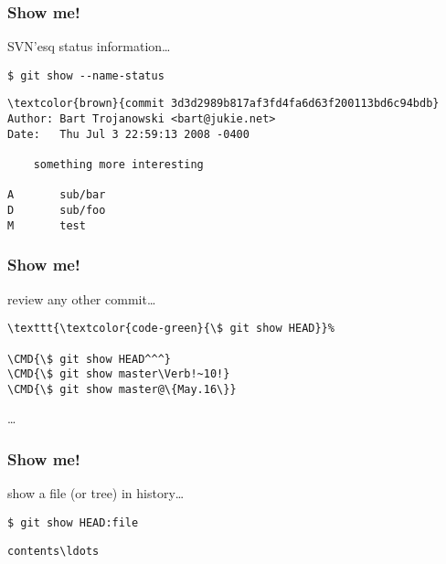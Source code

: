 \documentclass[english]{beamer}
\newcommand{\CMD}[1]{%
\texttt{\textcolor{code-green}{#1}}%
}
\begin{document}
\begin{frame}[fragile]
\frametitle{Show me!}

SVN'esq status information\ldots
\vspace{\baselineskip}

\CMD{\$ git show {-}-name-status}
{\small
\begin{Verbatim}[commandchars=\\\{\}]
\textcolor{brown}{commit 3d3d2989b817af3fd4fa6d63f200113bd6c94bdb}
Author: Bart Trojanowski <bart@jukie.net>
Date:   Thu Jul 3 22:59:13 2008 -0400

    something more interesting

A       sub/bar
D       sub/foo
M       test
\end{Verbatim}
}
\vspace{\textheight}
\end{frame}

\begin{frame}[fragile]
\frametitle{Show me!}

review any other commit\ldots
\vspace{\baselineskip}

\begin{Verbatim}[commandchars=\\\{\}]
\CMD{\$ git show HEAD}
\CMD{\$ git show HEAD^^^}
\CMD{\$ git show master\Verb!~10!}
\CMD{\$ git show master@\{May.16\}}
\end{Verbatim}

\ldots

\vspace{\textheight}
\end{frame}

\begin{frame}[fragile]
\frametitle{Show me!}

show a file (or tree) in history\ldots
\vspace{\baselineskip}

\CMD{\$ git show HEAD:file}
{\small
\begin{Verbatim}[commandchars=\\\{\}]
contents\ldots
\end{Verbatim}
}
\vspace{\textheight}
\end{frame}
\end{document}
